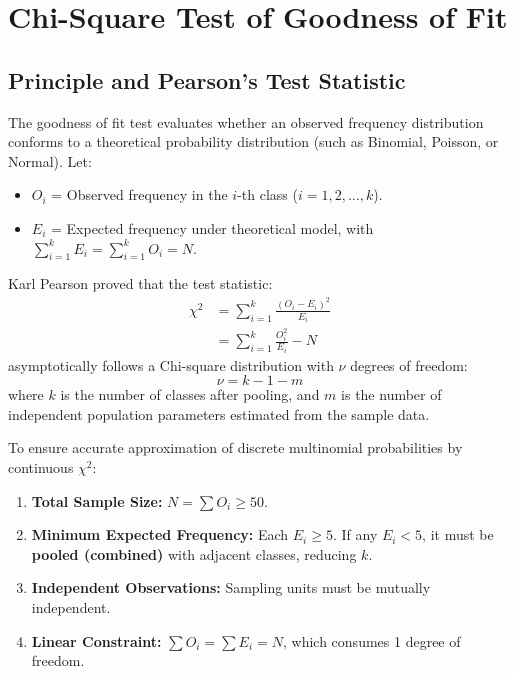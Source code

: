 \documentclass[12pt,a4paper]{article}
\begin{document}
\section{Chi-Square Test of Goodness of Fit}

\subsection{Principle and Pearson's Test Statistic}

\begin{tcolorbox}[defbox, title={\textbf{Pearson's Chi-Square Goodness of Fit}}]
The goodness of fit test evaluates whether an observed frequency distribution conforms to a theoretical probability distribution (such as Binomial, Poisson, or Normal). Let:
\begin{itemize}[leftmargin=12pt, itemsep=2pt]
  \item $O_i$ = Observed frequency in the $i$-th class ($i = 1, 2, \ldots, k$).
  \item $E_i$ = Expected frequency under theoretical model, with $\sum_{i=1}^k E_i = \sum_{i=1}^k O_i = N$.
\end{itemize}
Karl Pearson proved that the test statistic:
\begin{equation}
  \begin{aligned}
    \chi^2 &= \sum_{i=1}^k \frac{(O_i - E_i)^2}{E_i} \\[3pt]
    &= \sum_{i=1}^k \frac{O_i^2}{E_i} - N
  \end{aligned}
\end{equation}
asymptotically follows a Chi-square distribution with $\nu$ degrees of freedom:
\begin{equation}
  \nu = k - 1 - m
\end{equation}
where $k$ is the number of classes after pooling, and $m$ is the number of independent population parameters estimated from the sample data.
\end{tcolorbox}

\begin{tcolorbox}[formulabox, title={\textbf{Conditions for Validity of $\chi^2$ Test}}]
To ensure accurate approximation of discrete multinomial probabilities by continuous $\chi^2$:
\begin{enumerate}[leftmargin=14pt, itemsep=2pt]
  \item \textbf{Total Sample Size:} $N = \sum O_i \ge 50$.
  \item \textbf{Minimum Expected Frequency:} Each $E_i \ge 5$. If any $E_i < 5$, it must be \textbf{pooled (combined)} with adjacent classes, reducing $k$.
  \item \textbf{Independent Observations:} Sampling units must be mutually independent.
  \item \textbf{Linear Constraint:} $\sum O_i = \sum E_i = N$, which consumes 1 degree of freedom.
\end{enumerate}
\end{tcolorbox}
\end{document}
